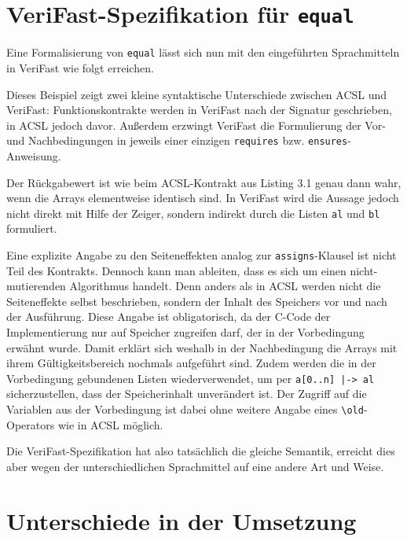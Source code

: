 \section{VeriFast-Spezifikation für \texttt{equal}}
\label{sec:design-by-contract:VeriFast-variante}

Eine Formalisierung von \texttt{equal} lässt sich nun mit den eingeführten Sprachmitteln in VeriFast wie folgt
erreichen.



Dieses Beispiel zeigt zwei kleine syntaktische Unterschiede zwischen ACSL und VeriFast: Funktionskontrakte
werden in VeriFast nach der Signatur geschrieben, in ACSL jedoch davor. Außerdem erzwingt VeriFast die
Formulierung der Vor- und Nachbedingungen in jeweils einer einzigen \lstinline{requires} bzw. \lstinline{ensures}-Anweisung.

Der Rückgabewert ist wie beim ACSL-Kontrakt aus Listing 3.1 genau dann wahr, wenn die Arrays elementweise
identisch sind. In VeriFast wird die Aussage jedoch nicht direkt mit Hilfe der Zeiger, sondern indirekt durch die
Listen \lstinline{al} und \lstinline{bl} formuliert.

Eine explizite Angabe zu den Seiteneffekten analog zur \lstinline{assigns}-Klausel ist nicht Teil des Kontrakts. 
Dennoch kann man ableiten, dass es sich um einen nicht-mutierenden Algorithmus handelt. Denn anders als in ACSL
werden nicht die Seiteneffekte selbst beschrieben, sondern der Inhalt des Speichers vor und nach der Ausführung.
Diese Angabe ist obligatorisch, da der C-Code der Implementierung nur auf Speicher zugreifen darf, der in der
Vorbedingung erwähnt wurde.
Damit erklärt sich weshalb in der Nachbedingung die Arrays mit ihrem Gültigkeitsbereich nochmals aufgeführt sind.
Zudem werden die in der Vorbedingung gebundenen Listen wiederverwendet, um per \lstinline{a[0..n] |-> al}
sicherzustellen, dass der Speicherinhalt unverändert ist. Der Zugriff auf die Variablen aus der Vorbedingung ist
dabei ohne weitere Angabe eines \lstinline{\old}-Operators wie in ACSL möglich.

Die VeriFast-Spezifikation hat also tatsächlich die gleiche Semantik, erreicht dies aber wegen der 
unterschiedlichen Sprachmittel auf eine andere Art und Weise.


\section{Unterschiede in der Umsetzung}

